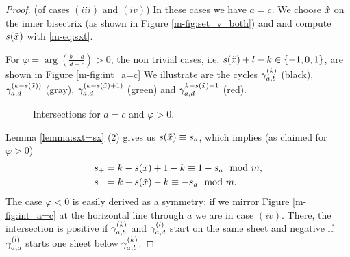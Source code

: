 \documentclass[main.tex]{subfiles}
\begin{document}
 \begin{proof}(of cases $(iii)$ and  $(iv)$)
 In these cases we have $a = c$. We choose $\tilde{x}$ on the inner bisectrix (as shown in Figure \ref{m-fig:set_v_both}) and 
   and compute $s(\tilde{x})$ with \eqref{m-eq:sxt}. 
 
 For $\varphi = \arg\left(\frac{b-a}{d-c}\right) > 0$, the non trivial cases, i.e. $s(\tilde{x}) + l - k \in \{-1,0,1\}$, are shown in Figure \ref{m-fig:int_a=c} 
  We illustrate are the cycles $\gamma_{a,b}^{(k)}$ (black), $\gamma_{a,d}^{(k-s(\tilde{x}))}$ (gray), $\gamma_{a,d}^{(k-s(\tilde{x}) + 1)}$ (green) and
    $\gamma_{a,d}^{k-s(\tilde{x})-1}$ (red).
  \begin{figure}[H]
      \begin{center}
   \scalebox{0.8}{}
      \end{center}
    \caption{Intersections for $a=c$ and $\varphi > 0$.}
    \label{fig:int_a=c}
   \end{figure}
   Lemma \ref{lemma:sxt=sx} (2) gives us $s(\tilde{x}) \equiv s_a$, which implies (as claimed for $\varphi > 0$)
    \begin{align*}
    & s_+ = k-s(\tilde{x})+1-k \equiv 1-s_a \mod m, \\
    & s_- = k-s(\tilde{x})-k \equiv -s_a \mod m.
    \end{align*}
  The case $\varphi < 0$ is easily derived as a symmetry: if we mirror Figure \ref{m-fig:int_a=c} at the horizontal line through $a$ we are in case $(iv)$.
  There, the intersection is positive if $\gamma_{a,b}^{(k)}$ and $\gamma_{a,d}^{(l)}$ start on the same sheet and negative if $\gamma_{a,d}^{(l)}$ starts one sheet below $\gamma_{a,b}^{(k)}$. 
  \end{proof}
  
\end{document}
